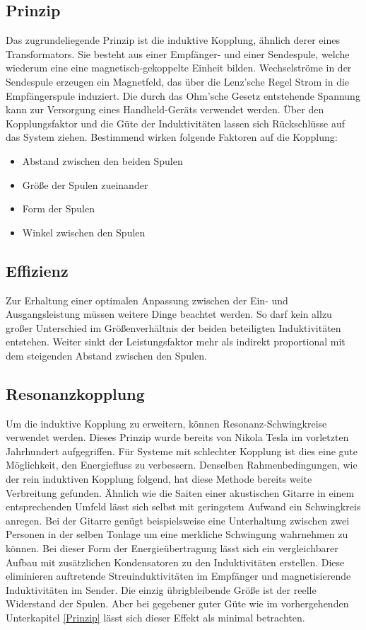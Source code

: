 \documentclass[12pt]{scrreprt} %
\begin{document}
\subsection{Prinzip}
\label{Prinzip}
Das zugrundeliegende Prinzip ist die induktive Kopplung, ähnlich derer eines Transformators. Sie besteht aus einer Empfänger- und einer Sendespule, welche wiederum eine eine magnetisch-gekoppelte Einheit bilden. Wechselströme in der Sendespule erzeugen ein Magnetfeld, das über die Lenz'sche Regel Strom in die Empfängerspule induziert. Die durch das Ohm'sche Gesetz entstehende Spannung kann zur Versorgung eines Handheld-Geräts verwendet werden. Über den Kopplungsfaktor und die Güte der Induktivitäten lassen sich Rückschlüsse auf das System ziehen. Bestimmend wirken folgende Faktoren auf die Kopplung:
\begin{itemize}
\item
Abstand zwischen den beiden Spulen
\item
Größe der Spulen zueinander
\item
Form der Spulen
\item
Winkel zwischen den Spulen
\end{itemize}
\subsection{Effizienz}
Zur Erhaltung einer optimalen Anpassung zwischen der Ein- und Ausgangsleistung müssen weitere Dinge beachtet werden. So darf kein allzu großer Unterschied im Größenverhältnis der beiden beteiligten Induktivitäten entstehen. Weiter sinkt der Leistungsfaktor mehr als indirekt proportional mit dem steigenden Abstand zwischen den Spulen. 
\subsection{Resonanzkopplung}
Um die induktive Kopplung zu erweitern, können Resonanz-Schwingkreise verwendet werden. Dieses Prinzip wurde bereits von Nikola Tesla im vorletzten Jahrhundert aufgegriffen. Für Systeme mit schlechter Kopplung ist dies eine gute Möglichkeit, den Energiefluss zu verbessern. Denselben Rahmenbedingungen, wie der rein induktiven Kopplung folgend, hat diese Methode bereits weite Verbreitung gefunden. Ähnlich wie die Saiten einer akustischen Gitarre in einem entsprechenden Umfeld lässt sich selbst mit geringstem Aufwand ein Schwingkreis anregen. Bei der Gitarre genügt beispielsweise eine Unterhaltung zwischen zwei Personen in der selben Tonlage um eine merkliche Schwingung wahrnehmen zu können. Bei dieser Form der Energieübertragung lässt sich ein vergleichbarer Aufbau mit zusätzlichen Kondensatoren zu den Induktivitäten erstellen. Diese eliminieren auftretende Streuinduktivitäten im Empfänger und magnetisierende Induktivitäten im Sender. Die einzig übrigbleibende Größe ist der reelle Widerstand der Spulen. Aber bei gegebener guter Güte wie im vorhergehenden Unterkapitel \vref{Prinzip} lässt sich dieser Effekt als minimal betrachten. 
\end{document}
